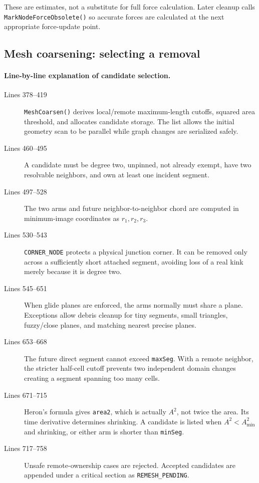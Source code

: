 \documentclass[11pt]{article}
\newcommand{\code}[1]{\texorpdfstring{\nolinkurl{#1}}{#1}}
\begin{document}
These are estimates, not a substitute for full force calculation. Later
cleanup calls \code{MarkNodeForceObsolete()} so accurate forces are calculated
at the next appropriate force-update point.

\subsection{Mesh coarsening: selecting a removal}





\paragraph{Line-by-line explanation of candidate selection.}
\begin{description}
\item[Lines 378--419] \code{MeshCoarsen()} derives local/remote maximum-length
cutoffs, squared area threshold, and allocates candidate storage. The list
allows the initial geometry scan to be parallel while graph changes are
serialized safely.
\item[Lines 460--495] A candidate must be degree two, unpinned, not already
exempt, have two resolvable neighbors, and own at least one incident segment.
\item[Lines 497--528] The two arms and future neighbor-to-neighbor chord are
computed in minimum-image coordinates as \(r_1,r_2,r_3\).
\item[Lines 530--543] \code{CORNER_NODE} protects a physical junction corner.
It can be removed only across a sufficiently short attached segment, avoiding
loss of a real kink merely because it is degree two.
\item[Lines 545--651] When glide planes are enforced, the arms normally must
share a plane. Exceptions allow debris cleanup for tiny segments, small
triangles, fuzzy/close planes, and matching nearest precise planes.
\item[Lines 653--668] The future direct segment cannot exceed \code{maxSeg}.
With a remote neighbor, the stricter half-cell cutoff prevents two independent
domain changes creating a segment spanning too many cells.
\item[Lines 671--715] Heron's formula gives \code{area2}, which is actually
\(A^2\), not twice the area. Its time derivative determines shrinking. A
candidate is listed when \(A^2<A_{\min}^2\) and shrinking, or either arm is
shorter than \code{minSeg}.
\item[Lines 717--758] Unsafe remote-ownership cases are rejected. Accepted
candidates are appended under a critical section as \code{REMESH_PENDING}.
\end{description}
\end{document}
